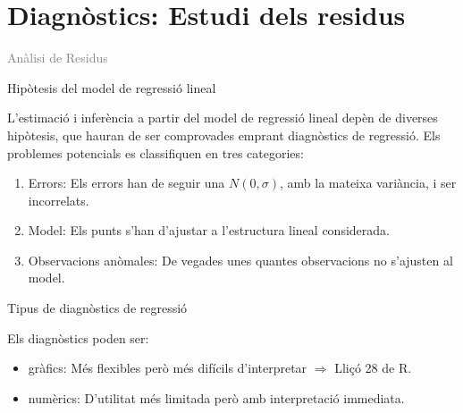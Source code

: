 \documentclass[12pt,t]{beamer}
\title[\red{Matemàtiques II}]{}
\author[]{}
\date{}
\newcommand{\gray}[1]{\textcolor{gray}{#1}}
\renewcommand{\emph}[1]{{\color{red}#1}}
\theoremstyle{plain}
\theoremstyle{definition}
\begin{document}
\beamertemplatedotitem

\lstset{breaklines=true}
\lstset{basicstyle=\ttfamily}


\section{Diagnòstics: Estudi dels residus}

\begin{frame}
\vfill
\begin{center}
\gray{\LARGE Anàlisi de Residus}
\end{center}
\vfill
\end{frame}

\begin{frame}{Hipòtesis del model de regressió lineal}

L'estimació i inferència a partir del model de regressió lineal depèn de diverses hipòtesis, que hauran de ser comprovades emprant \emph{diagnòstics de regressió}. Els problemes potencials es classifiquen en tres categories:

\begin{enumerate}
\item \emph{Errors}: Els errors han de seguir una $N(0,\sigma)$, amb la mateixa variància, i ser incorrelats.

\item \emph{Model}: Els punts s'han d'ajustar a l'estructura lineal considerada.

\item \emph{Observacions anòmales}: De vegades unes quantes observacions no s'ajusten al model.
\end{enumerate}

\end{frame}

\begin{frame}{Tipus de diagnòstics de regressió}

Els diagnòstics poden ser:
\begin{itemize}
\item \emph{gràfics}: Més flexibles però més difícils d'interpretar $\Rightarrow$ Lliçó 28 de R.
\item \emph{numèrics}: D'utilitat més limitada però amb interpretació immediata.
\end{itemize}

\end{frame}
\end{document}
